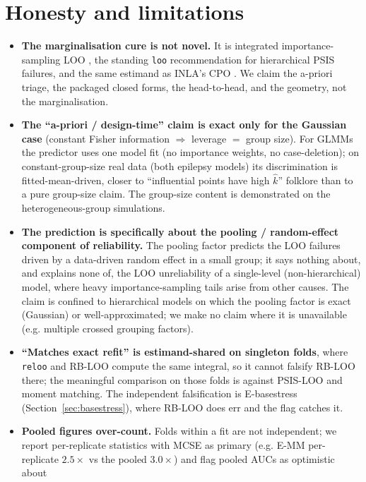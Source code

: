 \documentclass[11pt]{article}
\newcommand{\khat}{\hat{k}}
\begin{document}
\section{Honesty and limitations}
\begin{itemize}
\item \textbf{The marginalisation cure is not novel.} It is integrated
importance-sampling LOO \citep{merkle2019bayesian, vehtari2016glvm,
burkner2021efficient}, the standing \texttt{loo} recommendation for hierarchical
PSIS failures, and the same estimand as INLA's CPO
\citep{rue2009inla, held2010posterior}. We claim the a-priori triage, the packaged
closed forms, the head-to-head, and the geometry, not the marginalisation.
\item \textbf{The ``a-priori / design-time'' claim is exact only for the Gaussian
case} (constant Fisher information $\Rightarrow$ leverage $=$ group size). For GLMMs
the predictor uses one model fit (no importance weights, no case-deletion); on
constant-group-size real data (both epilepsy models) its discrimination is
fitted-mean-driven, closer to ``influential points have high $\khat$'' folklore than
to a pure group-size claim. The group-size content is demonstrated on the
heterogeneous-group simulations.
\item \textbf{The prediction is specifically about the pooling / random-effect
component of reliability.} The pooling factor predicts the LOO failures driven by a
data-driven random effect in a small group; it says nothing about, and explains none
of, the LOO unreliability of a single-level (non-hierarchical) model, where heavy
importance-sampling tails arise from other causes. The claim is confined to
hierarchical models on which the pooling factor is exact (Gaussian) or
well-approximated; we make no claim where it is unavailable (e.g. multiple crossed
grouping factors).
\item \textbf{``Matches exact refit'' is estimand-shared on singleton folds}, where
\texttt{reloo} and RB-LOO compute the same integral, so it cannot falsify RB-LOO
there; the meaningful comparison on those folds is against PSIS-LOO and moment
matching. The independent falsification is E-basestress (Section~\ref{sec:basestress}),
where RB-LOO does err and the flag catches it.
\item \textbf{Pooled figures over-count.} Folds within a fit are not independent;
we report per-replicate statistics with MCSE as primary (e.g. E-MM per-replicate
$2.5\times$ vs the pooled $3.0\times$) and flag pooled AUCs as optimistic about

\end{itemize}
\end{document}
